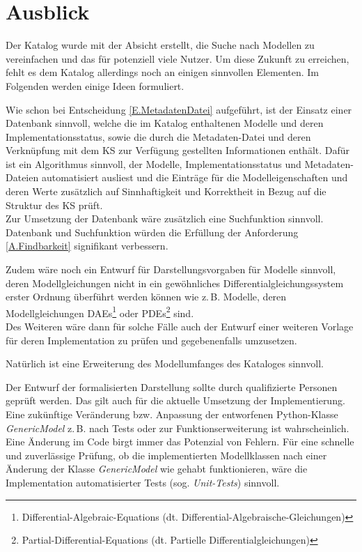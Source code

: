 \section{Ausblick} 
\label{Ch:ZsmfsgAusblick:Sec:Ausblick}
Der Katalog wurde mit der Absicht erstellt, die Suche nach Modellen zu vereinfachen und das für potenziell viele Nutzer. Um diese Zukunft zu erreichen,  fehlt es dem Katalog allerdings noch an einigen sinnvollen Elementen. Im Folgenden werden einige Ideen formuliert.

Wie schon bei Entscheidung \ref{E.MetadatenDatei} aufgeführt, ist der Einsatz einer Datenbank sinnvoll, welche die im Katalog enthaltenen Modelle und deren Implementationsstatus, sowie die durch die Metadaten-Datei und deren Verknüpfung mit dem KS zur Verfügung gestellten Informationen enthält. Dafür ist ein Algorithmus sinnvoll, der Modelle, Implementationsstatus und Metadaten-Dateien automatisiert ausliest und die Einträge für die Modelleigenschaften und deren Werte zusätzlich auf Sinnhaftigkeit und Korrektheit in Bezug auf die Struktur des KS prüft. \\
Zur Umsetzung der Datenbank wäre zusätzlich eine Suchfunktion sinnvoll. Datenbank und Suchfunktion würden die Erfüllung der Anforderung \ref{A.Findbarkeit} signifikant verbessern.

Zudem wäre noch ein Entwurf für Darstellungsvorgaben für Modelle sinnvoll, deren Modellgleichungen nicht in ein gewöhnliches Differentialgleichungssystem erster Ordnung überführt werden können wie z.\,B. Modelle, deren Modellgleichungen DAEs\footnote{Differential-Algebraic-Equations (dt. Differential-Algebraische-Gleichungen)} oder PDEs\footnote{Partial-Differential-Equations (dt. Partielle Differentialgleichungen)} sind.\\
Des Weiteren wäre dann für solche Fälle auch der Entwurf einer weiteren Vorlage für deren Implementation zu prüfen und gegebenenfalls umzusetzen.

Natürlich ist eine Erweiterung des Modellumfanges des Kataloges sinnvoll.

Der Entwurf der formalisierten Darstellung sollte durch qualifizierte Personen geprüft werden. Das gilt auch für die aktuelle Umsetzung der Implementierung. \\
Eine zukünftige Veränderung bzw. Anpassung der entworfenen Python-Klasse \textit{GenericModel} z.\,B. nach Tests oder zur Funktionserweiterung ist wahrscheinlich. Eine Änderung im Code birgt immer das Potenzial von Fehlern. Für eine schnelle und zuverlässige Prüfung, ob die implementierten Modellklassen nach einer Änderung der Klasse \textit{GenericModel} wie gehabt funktionieren, wäre die Implementation automatisierter Tests (sog. \textit{Unit-Tests}) sinnvoll.

